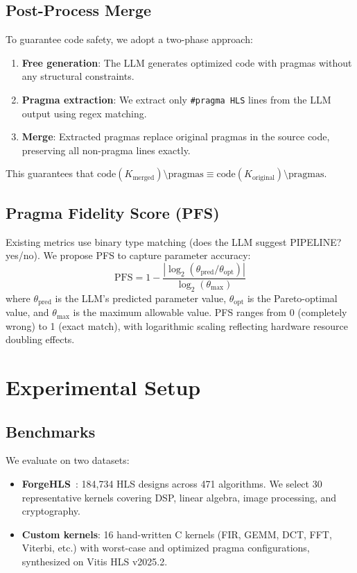 \documentclass[conference]{IEEEtran}
\begin{document}
\subsection{Post-Process Merge}
To guarantee code safety, we adopt a two-phase approach:
\begin{enumerate}
    \item \textbf{Free generation}: The LLM generates optimized code with
    pragmas without any structural constraints.
    \item \textbf{Pragma extraction}: We extract only \texttt{\#pragma HLS}
    lines from the LLM output using regex matching.
    \item \textbf{Merge}: Extracted pragmas replace original pragmas in the
    source code, preserving all non-pragma lines exactly.
\end{enumerate}
This guarantees that $\text{code}(K_{\text{merged}}) \setminus \text{pragmas}
\equiv \text{code}(K_{\text{original}}) \setminus \text{pragmas}$.

\subsection{Pragma Fidelity Score (PFS)}
Existing metrics use binary type matching (does the LLM suggest PIPELINE? yes/no).
We propose PFS to capture parameter accuracy:
\begin{equation}
    \text{PFS} = 1 - \frac{|\log_2(\theta_{\text{pred}} / \theta_{\text{opt}})|}
    {\log_2(\theta_{\max})}
\end{equation}
where $\theta_{\text{pred}}$ is the LLM's predicted parameter value,
$\theta_{\text{opt}}$ is the Pareto-optimal value, and $\theta_{\max}$ is the
maximum allowable value. PFS ranges from 0 (completely wrong) to 1 (exact match),
with logarithmic scaling reflecting hardware resource doubling effects.

\section{Experimental Setup}

\subsection{Benchmarks}
We evaluate on two datasets:
\begin{itemize}
    \item \textbf{ForgeHLS}~\cite{forgehls}: 184,734 HLS designs across 471
    algorithms. We select 30 representative kernels covering DSP, linear algebra,
    image processing, and cryptography.
    \item \textbf{Custom kernels}: 16 hand-written C kernels (FIR, GEMM, DCT,
    FFT, Viterbi, etc.) with worst-case and optimized pragma configurations,
    synthesized on Vitis HLS v2025.2.
\end{itemize}
\end{document}
